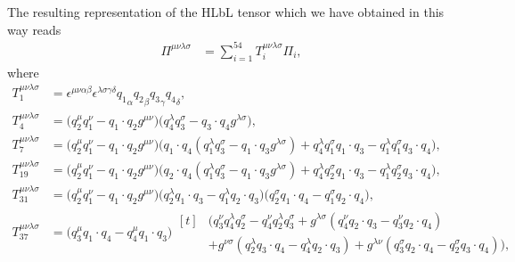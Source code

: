 \documentclass[epj]{webofc}
\newcommand{\<}{\langle}
\renewcommand{\>}{\rangle}
\begin{document}
The resulting representation of the HLbL tensor which we have obtained in
this way reads
\begin{align}
	\label{eqn:HLbLTensorKinematicFreeStructures}
	\Pi^{\mu\nu\lambda\sigma} &= \sum_{i=1}^{54} T_i^{\mu\nu\lambda\sigma} \Pi_i , 
\end{align}
where
\begin{align}
		\label{eq:HLbLBTTStructures}
		T_1^{\mu\nu\lambda\sigma} &= \epsilon^{\mu\nu\alpha\beta}
                \epsilon^{\lambda\sigma\gamma\delta} {q_1}_\alpha
                        {q_2}_\beta {q_3}_\gamma {q_4}_\delta , \nonumber \\
		T_4^{\mu\nu\lambda\sigma} &= \Big(q_2^\mu q_1^\nu - q_1
                \cdot q_2 g^{\mu \nu} \Big) \Big( q_4^\lambda q_3^\sigma -
                q_3 \cdot q_4 g^{\lambda \sigma} \Big) , \nonumber \\
		T_7^{\mu\nu\lambda\sigma} &= \Big(q_2^\mu q_1^\nu - q_1
                \cdot q_2 g^{\mu \nu } \Big) \Big( q_1 \cdot q_4
                \left(q_1^\lambda q_3^\sigma -q_1 \cdot q_3 g^{\lambda
                  \sigma} \right) + q_4^\lambda q_1^\sigma q_1 \cdot q_3 -
                q_1^\lambda q_1^\sigma q_3 \cdot q_4 \Big) , \nonumber \\
		 T_{19}^{\mu\nu\lambda\sigma} &= \Big( q_2^\mu q_1^\nu -
                 q_1 \cdot q_2 g^{\mu \nu } \Big) \Big(q_2 \cdot q_4
                 \left(q_1^\lambda q_3^\sigma - q_1 \cdot q_3
                 g^{\lambda\sigma} \right)+q_4^\lambda q_2^\sigma q_1 \cdot
                 q_3 - q_1^\lambda q_2^\sigma q_3 \cdot q_4 \Big) ,
                 \nonumber \\
		T_{31}^{\mu\nu\lambda\sigma} &= \Big(q_2^\mu q_1^\nu -
                q_1\cdot q_2 g^{\mu\nu}\Big) \Big(q_2^\lambda q_1\cdot q_3
                - q_1^\lambda q_2\cdot q_3\Big) \Big(q_2^\sigma q_1\cdot
                q_4 - q_1^\sigma q_2\cdot q_4\Big) , \nonumber \\
		T_{37}^{\mu\nu\lambda\sigma} &= \Big( q_3^\mu q_1\cdot q_4 - q_4^\mu q_1\cdot q_3\Big) \begin{aligned}[t]
			& \Big( q_3^\nu q_4^\lambda q_2^\sigma - q_4^\nu q_2^\lambda q_3^\sigma + g^{\lambda\sigma} \left(q_4^\nu q_2\cdot q_3 - q_3^\nu q_2\cdot q_4\right) \\
			& + g^{\nu\sigma} \left( q_2^\lambda q_3\cdot q_4 -
                  q_4^\lambda q_2\cdot q_3 \right) + g^{\lambda\nu} \left(
                  q_3^\sigma q_2\cdot q_4 - q_2^\sigma q_3\cdot q_4 \right)
                  \Big) , \end{aligned} \nonumber \\

\end{align}
\end{document}
